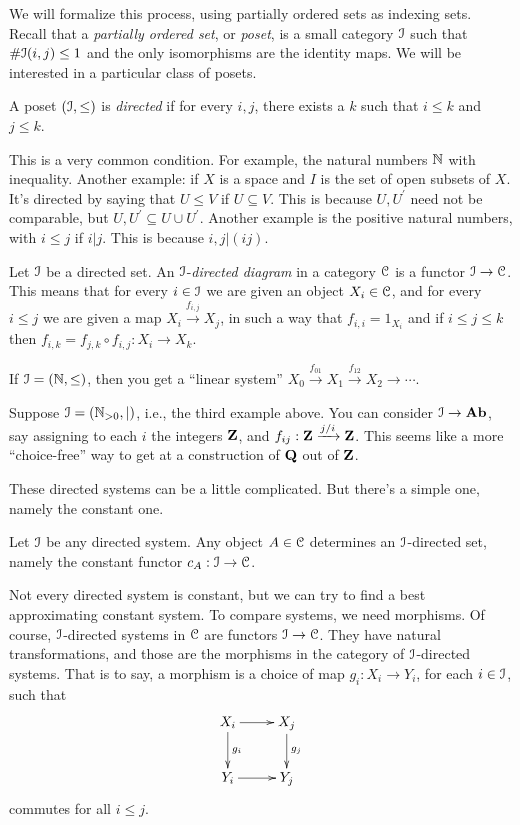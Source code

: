 We will formalize this process, using partially ordered sets as indexing sets.
Recall that a {\em partially ordered set}, or {\em poset}, is a small category $\mathcal I$ such that $\#\mathcal I(i,j)\leq 1$ and the only isomorphisms are the identity maps. We will be interested in a particular class of posets.
\begin{definition}
A poset $(\mathcal I,\leq)$ is \emph{directed} if for every $i,j$, there exists a $k$ such that $i\leq k$ and $j\leq k$.
\end{definition}
\begin{example}
This is a very common condition.
For example, the natural numbers $\mathbb N$ with inequality. Another example: if $X$ is a space and $I$ is the set of open subsets of $X$. It's directed by saying that $U\leq V$ if $U\subseteq V$. This is because $U,U^\prime$ need not be comparable, but $U,U^\prime\subseteq U\cup U^\prime$. Another example is the positive natural numbers, with $i\leq j$ if $i|j$. This is because $i,j|(ij)$.
\end{example}
\begin{definition}
Let $\mathcal I$ be a directed set. An $\mathcal I$-{\em directed diagram} in  a category $\mathcal C$ is a functor $\mathcal I\to\mathcal C$. This means that for every $i\in \mathcal I$ we are given an object $X_i\in\mathcal C$, and for every $i\leq j$ we are given a map $X_i\xrightarrow{f_{i,j}} X_j$, in such a way that $f_{i,i}=1_{X_i}$ and if $i\leq j\leq k$
then $f_{i,k}=f_{j,k}\circ f_{i,j}:X_i\to X_k$. 
\end{definition}
\begin{example}\label{linear}
If $\mathcal I=(\mathbb N,\leq)$, then you get a ``linear system'' $X_0\xrightarrow{f_{01}}X_1\xrightarrow{f_{12}}X_2\to\cdots$. 
\end{example}
\begin{example}
Suppose $\mathcal I=(\mathbb N_{>0},|)$, i.e., the third example above. You can consider $\mathcal I\to\mathbf{Ab}$, say assigning to each $i$ the integers $\mathbf Z$, and $f_{ij}:\mathbf Z\xrightarrow{j/i}\mathbf Z$. This seems like a more ``choice-free'' way to get at a construction of $\mathbf Q$ out of $\mathbf Z$. 
\end{example}
These directed systems can be a little complicated. But there's a simple one, namely the constant one. 
\begin{example}
Let $\mathcal I$ be any directed system. Any object $A\in\mathcal C$ determines an $\mathcal I$-directed set, namely the constant functor $c_A:\mathcal I\to\mathcal C$.
\end{example}
Not every directed system is constant, but we can try to find a best approximating constant system. To compare systems, we need morphisms. 
Of course, $\mathcal I$-directed systems in $\mathcal C$ are functors $\mathcal I\to\mathcal C$. They have natural transformations, and those are the morphisms in the category of $\mathcal I$-directed systems. That is to say, a morphism is a choice of map $g_i:X_i\to Y_i$, for each $i\in\mathcal I$, such that 
\begin{equation*}
\xymatrix{X_i\ar[r]\ar[d]^{g_i} & X_j\ar[d]^{g_j}\\
Y_i\ar[r] & Y_j}
\end{equation*}
commutes for all $i\leq j$.


